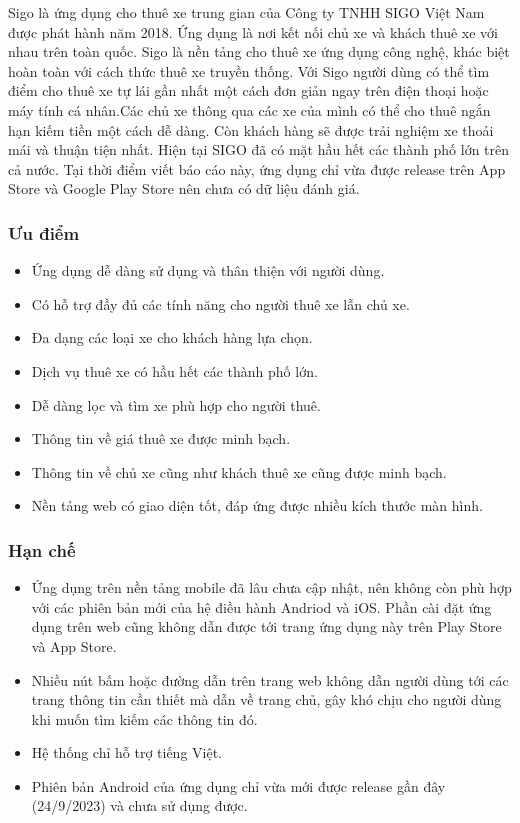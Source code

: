 \documentclass[../main.tex]{subfiles}
\begin{document}
	Sigo là ứng dụng cho thuê xe trung gian của Công ty TNHH SIGO Việt Nam được phát hành năm 2018. Ứng dụng là nơi
	kết nối chủ xe và khách thuê xe với nhau trên toàn quốc. Sigo là nền tảng cho thuê xe ứng dụng công nghệ, khác
	biệt hoàn toàn với cách thức thuê xe truyền thống. Với Sigo người dùng có thể tìm điểm cho thuê xe tự lái gần nhất
	một cách đơn giản ngay trên điện thoại hoặc máy tính cá nhân.Các chủ xe thông qua các xe của mình có thể cho thuê
	ngắn hạn kiếm tiền một cách dễ dàng. Còn khách hàng sẽ được trải nghiệm xe thoải mái và thuận tiện nhất. Hiện
	tại SIGO đã có mặt hầu hết các thành phố lớn trên cả nước. Tại thời điểm viết báo cáo này, ứng dụng chỉ vừa được
	release trên App Store và Google Play Store nên chưa có dữ liệu đánh giá.

	\subsubsection{Ưu điểm}
	\begin{itemize}
		\item Ứng dụng dễ dàng sử dụng và thân thiện với người dùng.
		\item Có hỗ trợ đầy đủ các tính năng cho người thuê xe lẫn chủ xe.
		\item Đa dạng các loại xe cho khách hàng lựa chọn.
		\item Dịch vụ thuê xe có hầu hết các thành phố lớn.
		\item Dễ dàng lọc và tìm xe phù hợp cho người thuê.
		\item Thông tin về giá thuê xe được minh bạch.
		\item Thông tin về chủ xe cũng như khách thuê xe cũng được minh bạch.
		\item Nền tảng web có giao diện tốt, đáp ứng được nhiều kích thước màn hình.
	\end{itemize}

	\subsubsection{Hạn chế}

	\begin{itemize}
		\item Ứng dụng trên nền tảng mobile đã lâu chưa cập nhật, nên không còn phù hợp với các phiên bản mới của hệ
		điều hành Andriod và iOS. Phần cài đặt ứng dụng trên web cũng không dẫn được tới trang ứng dụng này trên Play
		Store và App Store.
		\item Nhiều nút bấm hoặc đường dẫn trên trang web không dẫn người dùng tới các trang thông tin cần thiết mà dẫn
		về trang chủ, gây khó chịu cho người dùng khi muốn tìm kiếm các thông tin đó.
		\item Hệ thống chỉ hỗ trợ tiếng Việt.
		\item Phiên bản Android của ứng dụng chỉ vừa mới được release gần đây (24/9/2023) và chưa sử dụng được.
	\end{itemize}
\end{document}
